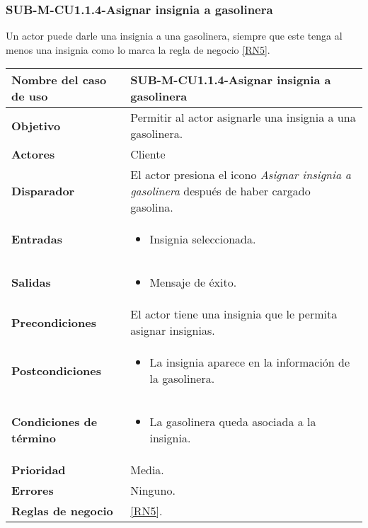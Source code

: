 \subsubsection{SUB-M-CU1.1.4-Asignar insignia a gasolinera}\label{SUB-M-CU1.1.4}
Un actor puede darle una insignia a una gasolinera, siempre que este tenga al menos una insignia como lo marca la regla de negocio \ref{RN5}.

\begin{longtable}{|J{5cm}|J{10.3cm}|}
	\hline
	\textbf{Nombre del caso de uso} &
		SUB-M-CU1.1.4-Asignar insignia a gasolinera \\ \hline
	\textbf{Objetivo} &
		Permitir al actor asignarle una insignia a una gasolinera. \\ \hline
	\textbf{Actores} &
		Cliente \\ \hline 
	\textbf{Disparador} & 
		El actor presiona el icono \textit{Asignar insignia a gasolinera} después de haber cargado gasolina. \\ \hline 
	\textbf{Entradas} & 
		\begin{itemize}
				\item Insignia seleccionada.
		\end{itemize}\\ \hline
	\textbf{Salidas} & 
		\begin{itemize}
			\item Mensaje de éxito.
		\end{itemize} \\ \hline
	\textbf{Precondiciones} &
		El actor tiene una insignia que le permita asignar insignias.\\ \hline
	\textbf{Postcondiciones} &
		\begin{itemize}
			\item La insignia aparece en la información de la gasolinera.
		\end{itemize} \\ \hline
	\textbf{Condiciones de término} & 
		\begin{itemize}
			\item La gasolinera queda asociada a la insignia.
		\end{itemize} \\ \hline 
	\textbf{Prioridad} & 
		Media. \\ \hline
	\textbf{Errores} & Ninguno.
		\\ \hline
	\textbf{Reglas de negocio} & \ref{RN5}.
		 \\ \hline
\end{longtable}

